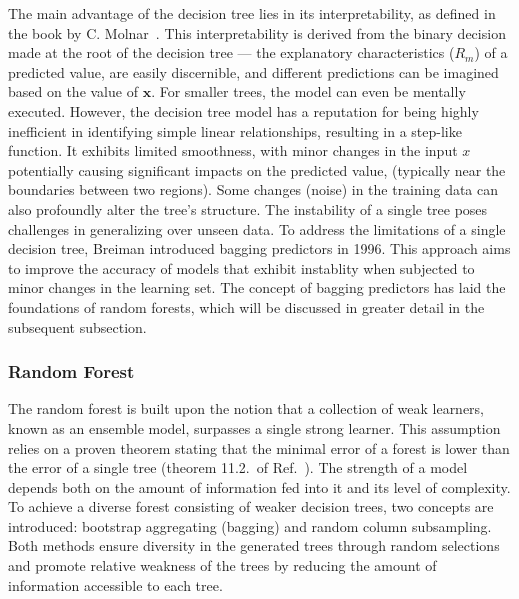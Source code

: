 \documentclass[main]{subfiles}
\begin{document}
The main advantage of the decision tree lies in its interpretability, as defined in the book by C. Molnar~\cite{molnar2020interpretable}. This interpretability is derived from the binary decision made at the root of the decision tree --- the explanatory characteristics ($R_m$) of a predicted value, are easily discernible, and different predictions can be imagined based on the value of $\mathbf{x}$. For smaller trees, the model can even be mentally executed. However, the decision tree model has a reputation for being highly inefficient in identifying simple linear relationships, resulting in a step-like function. It exhibits limited smoothness, with minor changes in the input $x$ potentially causing significant impacts on the predicted value, (typically near the boundaries between two regions). Some changes (noise) in the training data can also profoundly alter the tree's structure. The instability of a single tree poses challenges in generalizing over unseen data.\autocite{molnar2020interpretable} To address the limitations of a single decision tree, Breiman introduced bagging predictors in 1996. This approach aims to improve the accuracy of models that exhibit instablity when subjected to minor changes in the learning set.\autocite{Breiman_1996} The concept of bagging predictors has laid the foundations of random forests, which will be discussed in greater detail in the subsequent subsection.

\subsubsection{Random Forest}

The random forest is built upon the notion that a collection of weak learners, known as an ensemble model, surpasses a single strong learner. This assumption relies on a proven theorem stating that the minimal error of a forest is lower than the error of a single tree (theorem 11.2.\ of Ref.~\cite{Breiman_2001}). The strength of a model depends both on the amount of information fed into it and its level of complexity. To achieve a diverse forest consisting of weaker decision trees, two concepts are introduced: bootstrap aggregating (bagging) and random column subsampling. Both methods ensure diversity in the generated trees through random selections and promote relative weakness of the trees by reducing the amount of information accessible to each tree.
\end{document}
